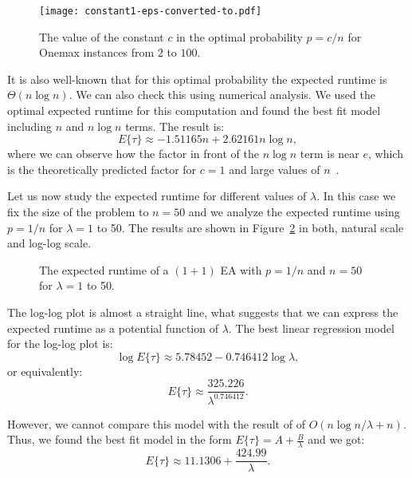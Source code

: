 \documentclass{article}
\newcommand{\Exp}[1]{E\{#1\}}
\begin{document}
\begin{figure}[!ht]
\centering
\texttt{[image: constant1-eps-converted-to.pdf]}
\caption{The value of the constant $c$ in the optimal probability $p=c/n$ for Onemax instances from $2$ to $100$.}
\label{fig:constant}
\end{figure}

It is also well-known that for this optimal probability the expected runtime is $\Theta (n \log n)$. We can also check this using numerical analysis. We used the optimal expected runtime for this computation and found the best fit model including $n$ and $n \log n$ terms. The result is:
\begin{equation}
\Exp{\tau} \approx  -1.51165 n + 2.62161 n \log n ,
\end{equation}
where we can observe how the factor in front of the $n \log n$ term is near $e$, which is the theoretically predicted factor for $c=1$ and large values of $n$~\citep{Witt2013tight}.


Let us now study the expected runtime for different values of $\lambda$. In this case we fix the size of the problem to $n=50$ and we analyze the expected runtime using $p=1/n$ for $\lambda=1$ to 50. The results are shown in Figure~\ref{fig:lambda} in both, natural scale and log-log scale.

\begin{figure}[!ht]
\centering
{}
\caption{The expected runtime of a $(1+1)$ EA with $p=1/n$ and $n=50$ for $\lambda=1$ to 50.}
\label{fig:lambda}
\end{figure}

The log-log plot is almost a straight line, what suggests that we can express the expected runtime as a potential function of $\lambda$. The best linear regression model for the log-log plot is:
\begin{equation}
\log \Exp{\tau} \approx 5.78452 - 0.746412 \log \lambda ,
\end{equation}
or equivalently:
\begin{equation}
\Exp{\tau} \approx \frac{325.226}{\lambda^{0.746412}} .
\end{equation}

However, we cannot compare this model with the result of \cite{Jansen2005} of $O(n \log n/\lambda +n)$. Thus, we found the best fit model in the form $\Exp{\tau} = A + \frac{B}{\lambda}$ and we got:
\begin{equation}
\Exp{\tau} \approx 11.1306 +\frac{424.99}{\lambda } .
\end{equation}
\end{document}
